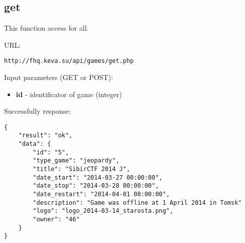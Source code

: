 \subsection{get}
\par

This function access for all.

URL:
\begin{Verbatim}[frame=single]
http://fhq.keva.su/api/games/get.php
\end{Verbatim}

Input parameters (GET or POST):
\begin{itemize}
  \item \textbf{id} - identificator of game (integer)
\end{itemize}

Successfully response:  \\
\begin{Verbatim}[frame=single]
{
    "result": "ok",
    "data": {
        "id": "5",
        "type_game": "jeopardy",
        "title": "SibirCTF 2014 J",
        "date_start": "2014-03-27 00:00:00",
        "date_stop": "2014-03-28 00:00:00",
        "date_restart": "2014-04-01 08:00:00",
        "description": "Game was offline at 1 April 2014 in Tomsk"
        "logo": "logo_2014-03-14_starosta.png",
        "owner": "46"
    }
}
\end{Verbatim}

~